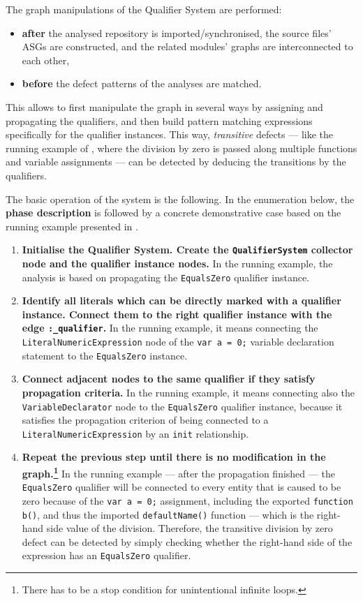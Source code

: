 The graph manipulations of the Qualifier System are performed:
\begin{itemize}
\item \textbf{after} the analysed repository is imported/synchronised, the source files' ASGs are constructed, and the related modules' graphs are interconnected to each other,
\item \textbf{before} the defect patterns of the analyses are matched.
\end{itemize}

This allows to first manipulate the graph in several ways by assigning and propagating the qualifiers, and then build pattern matching expressions specifically for the qualifier instances. This way, \emph{transitive} defects — like the running example of , where the division by zero is passed along multiple functions and variable assignments — can be detected by deducing the transitions by the qualifiers.

The basic operation of the system is the following. In the enumeration below, the \textbf{phase description} is followed by a concrete demonstrative case based on the running example presented in .

\begin{enumerate}
\item \textbf{Initialise the Qualifier System. Create the \lstinline{QualifierSystem} collector node and the qualifier instance nodes.} In the running example, the analysis is based on propagating the \lstinline{EqualsZero} qualifier instance.
\item \textbf{Identify all literals which can be directly marked with a qualifier instance. Connect them to the right qualifier instance with the edge \lstinline{:_qualifier}.} In the running example, it means connecting the \lstinline{LiteralNumericExpression} node of the \lstinline{var a = 0;} variable declaration statement to the \lstinline{EqualsZero} instance.
\item \textbf{Connect adjacent nodes to the same qualifier if they satisfy propagation criteria.} In the running example, it means connecting also the \lstinline{VariableDeclarator} node to the \lstinline{EqualsZero} qualifier instance, because it satisfies the propagation criterion of being connected to a \lstinline{LiteralNumericExpression} by an \lstinline{init} relationship.
\item \textbf{Repeat the previous step until there is no modification in the graph.\footnote{There has to be a stop condition for unintentional infinite loops.}} In the running example — after the propagation finished — the \lstinline{EqualsZero} qualifier will be connected to every entity that is caused to be zero because of the \lstinline{var a = 0;} assignment, including the exported \lstinline{function b()}, and thus the imported \lstinline{defaultName()} function — which is the right-hand side value of the division. Therefore, the transitive division by zero defect can be detected by simply checking whether the right-hand side of the expression has an \lstinline{EqualsZero} qualifier.
\end{enumerate}

